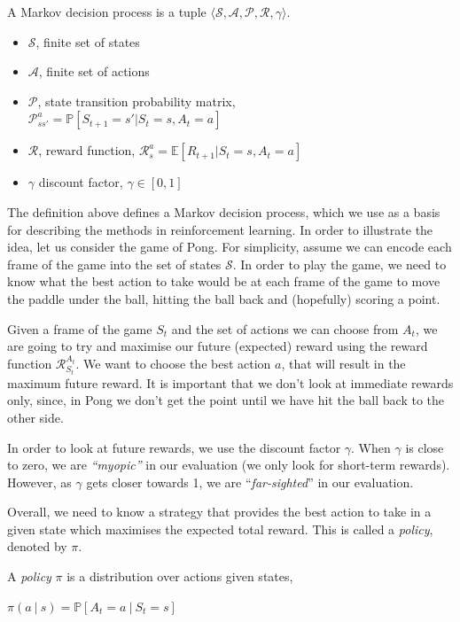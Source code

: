 \begin{defn}
	A Markov decision process is a tuple $\langle \mathcal{S}, \mathcal{A}, \mathcal{P}, \mathcal{R}, \gamma \rangle$.
	\begin{itemize}
		\item $\mathcal{S}$, finite set of states
		\item $\mathcal{A}$, finite set of actions
		\item $\mathcal{P}$, state transition probability matrix,~\\$\mathcal{P}_{ss'}^a = \mathbb{P}[S_{t+1}=s'|S_t=s, A_t=a]$
		\item $\mathcal{R}$, reward function, $\mathcal{R}_s^a = \mathbb{E}[R_{t+1}|S_t=s,A_t=a]$
		\item $\gamma$ discount factor, $\gamma\in[0,1]$
	\end{itemize}
\end{defn}

The definition above defines a Markov decision process, which we use as a basis for describing the methods in reinforcement learning. In order to illustrate the idea, let us consider the game of Pong. For simplicity, assume we can encode each frame of the game into the set of states $\mathcal{S}$. In order to play the game, we need to know what the best action to take would be at each frame of the game to move the paddle under the ball, hitting the ball back and (hopefully) scoring a point.

Given a frame of the game $S_t$ and the set of actions we can choose from $A_t$, we are going to try and maximise our future (expected) reward using the reward function $\mathcal{R}_{S_t}^{A_t}$. We want to choose the best action $a$, that will result in the maximum future reward. It is important that we don't look at immediate rewards only, since, in Pong we don't get the point until we have hit the ball back to the other side.

In order to look at future rewards, we use the discount factor $\gamma$. When $\gamma$ is close to zero, we are \textit{``myopic''} in our evaluation (we only look for short-term rewards). However, as $\gamma$ gets closer towards 1, we are ``\textit{far-sighted}'' in our evaluation.

Overall, we need to know a strategy that provides the best action to take in a given state which maximises the expected total reward. This is called a \textit{policy}, denoted by $\pi$.

\begin{defn}
	A \textit{policy} $\pi$ is a distribution over actions given states,
	\begin{center}
		$\pi(a~|~s)=\mathbb{P}[A_t=a~|~S_t=s]$
	\end{center}
\end{defn}

